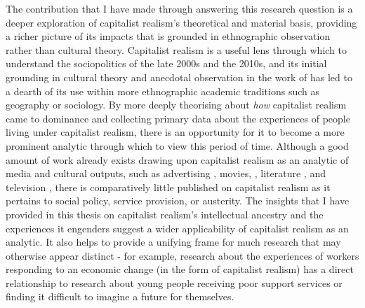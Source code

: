 The contribution that I have made through answering this research question is a deeper exploration of capitalist realism's theoretical and material basis, providing a richer picture of its impacts that is grounded in ethnographic observation rather than cultural theory. Capitalist realism is a useful lens through which to understand the sociopolitics of the late 2000s and the 2010s, and its initial grounding in cultural theory and anecdotal observation in the work of \citet{fisher_capitalist_2009} has led to a dearth of its use within more ethnographic academic traditions such as geography or sociology. By more deeply theorising about \textit{how} capitalist realism came to dominance and collecting primary data about the experiences of people living under capitalist realism, there is an opportunity for it to become a more prominent analytic through which to view this period of time. Although a good amount of work already exists drawing upon capitalist realism as an analytic of media and cultural outputs, such as advertising \citep{schudson_advertising_2013}, movies, \citep{flisfeder_love_2017}, literature \citep{jr_for_2022}, and television \citep{la_berge_capitalist_2010}, there is comparatively little published on capitalist realism as it pertains to social policy, service provision, or austerity. The insights that I have provided in this thesis on  capitalist realism's intellectual ancestry and the experiences it engenders suggest a wider applicability of capitalist realism as an analytic. It also helps to provide a unifying frame for much research that may otherwise appear distinct - for example, research about the experiences of workers responding to an economic change (in the form of capitalist realism) has a direct relationship to research about young people receiving poor support services or finding it difficult to imagine a future for themselves.  

